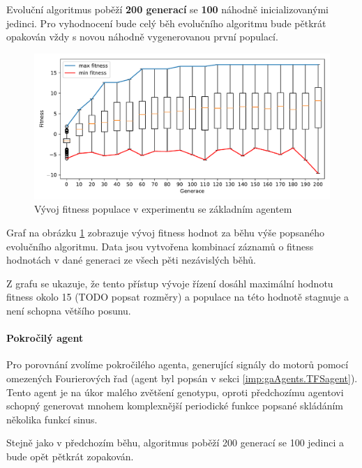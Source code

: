 Evoluční algoritmus poběží \textbf{200 generací} se \textbf{100} náhodně
inicializovanými jedinci. Pro vyhodnocení bude celý běh evolučního algoritmu
bude pětkrát opakován vždy s novou náhodně vygenerovanou první populací.

\begin{figure}[!h]
    \centering
    \includegraphics[width=1\textwidth]{../img/experiment1_Sine_10ticks.pdf}
    \caption{Vývoj fitness populace v experimentu se základním agentem}
    \label{exp:first_sinefull}
\end{figure}

Graf na obrázku \ref{exp:first_sinefull} zobrazuje vývoj fitness
hodnot za běhu výše popsaného evolučního algoritmu. Data jsou vytvořena
kombinací záznamů o fitness hodnotách v dané generaci ze všech pěti nezávislých
běhů.

Z grafu se ukazuje, že tento přístup vývoje řízení dosáhl maximální hodnotu
fitness okolo 15 (TODO popsat rozměry) a populace na této hodnotě stagnuje a
není schopna většího posunu.

\paragraph{Pokročilý agent}
Pro porovnání zvolíme pokročilého agenta, generující signály do motorů pomocí
omezených Fourierových řad (agent byl popsán v sekci
\ref{imp:gaAgents.TFSagent}). Tento agent je na úkor malého zvětšení genotypu,
oproti předchozímu agentovi schopný generovat mnohem komplexnější periodické
funkce popsané skládáním několika funkcí sinus.

Stejně jako v předchozím běhu, algoritmus poběží 200 generací se 100 jedinci a
bude opět pětkrát zopakován.


